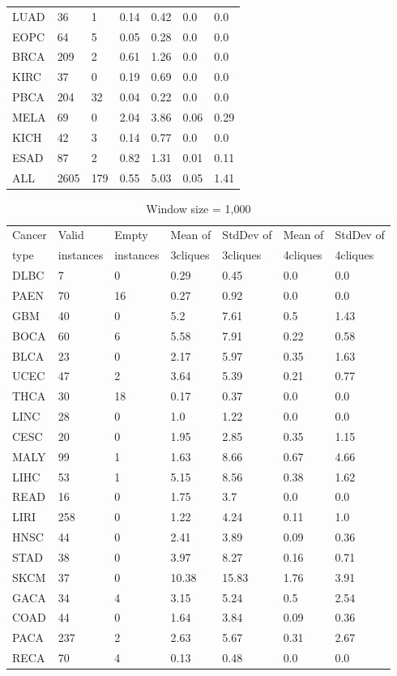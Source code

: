 \documentclass[a4paper,10pt]{article}
\begin{document}
\begin{table}[]
\begin{tabular}{l|l|l|l|l|l|l}
LUAD&36&1&0.14&0.42&0.0&0.0\\
EOPC&64&5&0.05&0.28&0.0&0.0\\
BRCA&209&2&0.61&1.26&0.0&0.0\\
KIRC&37&0&0.19&0.69&0.0&0.0\\
PBCA&204&32&0.04&0.22&0.0&0.0\\
MELA&69&0&2.04&3.86&0.06&0.29\\
KICH&42&3&0.14&0.77&0.0&0.0\\
ESAD&87&2&0.82&1.31&0.01&0.11\\
ALL&2605&179&0.55&5.03&0.05&1.41\\
\end{tabular}
\end{table}


\begin{table}[]
\centering
\caption{Window size = 1,000}
\label{my-label}
\begin{tabular}{l|l|l|l|l|l|l}
Cancer & Valid & Empty & Mean of & StdDev of& Mean of & StdDev of \\ 
type & instances  & instances & 3cliques & 3cliques & 4cliques & 4cliques \\ \hline 
DLBC&7&0&0.29&0.45&0.0&0.0\\
PAEN&70&16&0.27&0.92&0.0&0.0\\
GBM&40&0&5.2&7.61&0.5&1.43\\
BOCA&60&6&5.58&7.91&0.22&0.58\\
BLCA&23&0&2.17&5.97&0.35&1.63\\
UCEC&47&2&3.64&5.39&0.21&0.77\\
THCA&30&18&0.17&0.37&0.0&0.0\\
LINC&28&0&1.0&1.22&0.0&0.0\\
CESC&20&0&1.95&2.85&0.35&1.15\\
MALY&99&1&1.63&8.66&0.67&4.66\\
LIHC&53&1&5.15&8.56&0.38&1.62\\
READ&16&0&1.75&3.7&0.0&0.0\\
LIRI&258&0&1.22&4.24&0.11&1.0\\
HNSC&44&0&2.41&3.89&0.09&0.36\\
STAD&38&0&3.97&8.27&0.16&0.71\\
SKCM&37&0&10.38&15.83&1.76&3.91\\
GACA&34&4&3.15&5.24&0.5&2.54\\
COAD&44&0&1.64&3.84&0.09&0.36\\
PACA&237&2&2.63&5.67&0.31&2.67\\
RECA&70&4&0.13&0.48&0.0&0.0\\

\end{tabular}
\end{table}
\end{document}
